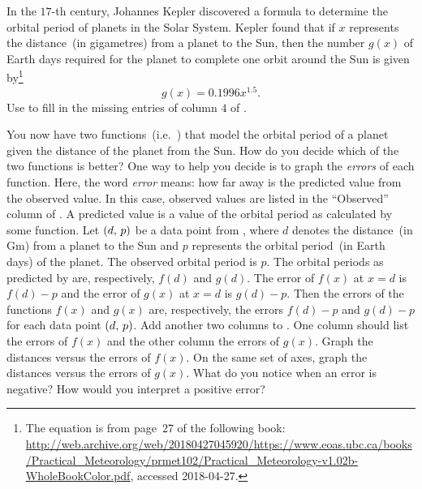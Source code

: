 \documentclass[a4paper,oneside,12pt]{article}
\begin{document}
\begin{problem}
\begin{packedenum}
  \item\label{subprob:planetary_orbit_Kepler}
    In the $17$-th century, Johannes Kepler discovered a formula to
    determine the orbital period of planets in the Solar System.
    Kepler found that if $x$ represents the distance~(in gigametres)
    from a planet to the Sun, then the number $g(x)$ of Earth days
    required for the planet to complete one orbit around the Sun is
    given by\footnote{
      The equation is from page~27 of the following book:
      \url{http://web.archive.org/web/20180427045920/https://www.eoas.ubc.ca/books/Practical_Meteorology/prmet102/Practical_Meteorology-v1.02b-WholeBookColor.pdf},
      accessed 2018-04-27.
    }
    \begin{equation}
    \label{eqn:Earth_days_orbit_Kepler}
    g(x)
    =
    0.1996x^{1.5}.
    \end{equation}
    Use  to fill in the missing
    entries of column $4$ of .

  \item\label{subprob:planetary_orbit_comparison}
    You now have two
    functions~(i.e.~)
    that model the orbital period of a planet given the distance of
    the planet from the Sun.  How do you decide which of the two
    functions is better?  One way to help you decide is to graph the
    \emph{errors} of each function.  Here, the word \emph{error}
    means: how far away is the predicted value from the observed
    value.  In this case, observed values are listed in the
    ``Observed'' column of .  A
    predicted value is a value of the orbital period as calculated by
    some function.  Let $\left\lparen{d},\, {p}\right\rparen$ be a data point from
    , where $d$ denotes the
    distance~(in Gm) from a planet to the Sun and $p$ represents the
    orbital period~(in Earth days) of the planet.  The observed
    orbital period is $p$.  The orbital periods as predicted by
    are, respectively, $f(d)$ and $g(d)$.  The error of $f(x)$ at
    $x = d$ is $f(d) - p$ and the error of $g(x)$ at $x = d$ is
    $g(d) - p$.  Then the errors of the functions $f(x)$ and $g(x)$
    are, respectively, the errors $f(d) - p$ and $g(d) - p$ for each
    data point $\left\lparen{d},\, {p}\right\rparen$.  Add another two columns to
    .  One column should list the
    errors of $f(x)$ and the other column the errors of $g(x)$.  Graph
    the distances versus the errors of $f(x)$.  On the same set of
    axes, graph the distances versus the errors of $g(x)$.  What do
    you notice when an error is negative?  How would you interpret a
    positive error?


\end{packedenum}
\end{problem}
\end{document}
